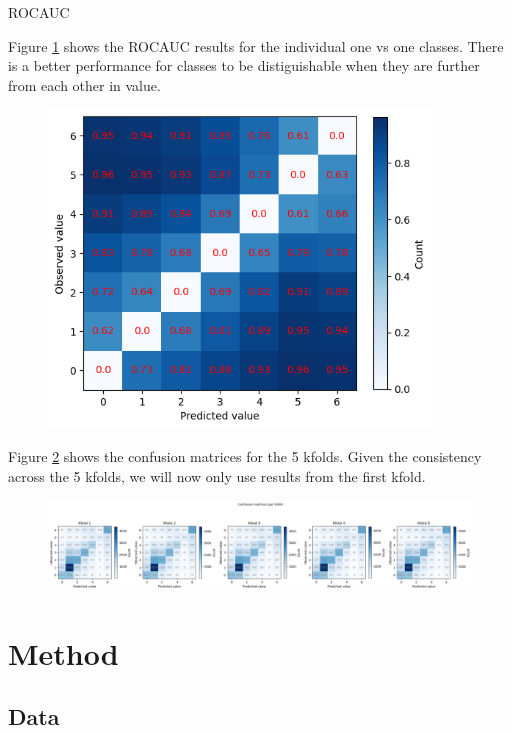 {ROCAUC}

Figure \ref{fig:confusion_rocauc} shows the ROCAUC results for the individual one vs one classes. There is a better performance for classes to be distiguishable when they are further from each other in value. 

\begin{figure}
    \centering
    {\includegraphics[width = 4in]{./images/040_ROCAUC_confusion_matrix_ovo.png}}\\
    \caption{}
    \label{fig:confusion_rocauc}
\end{figure}

Figure \ref{fig:confusion_mrs} shows the confusion matrices for the 5 kfolds. Given the consistency across the 5 kfolds, we will now only use results from the first kfold.

\begin{figure}[!h]
    \centering
    \includegraphics[trim={0 0 0 1.2cm}, clip, width=1\textwidth]{./images/040_confusion_matrices_5fold.png}\\
    \caption{}
    \label{fig:confusion_mrs}
\end{figure}


\section{Method}

\subsection{Data}

